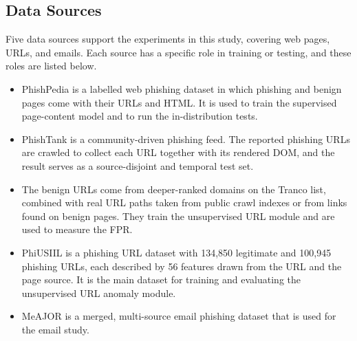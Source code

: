 \documentclass{FastFyp}
\begin{document}
\subsection{Data Sources}
Five data sources support the experiments in this study, covering web pages, URLs, and emails. Each source has a specific role in training or testing, and these roles are listed below.
\begin{itemize}
    \item PhishPedia \cite{phishpedia2021} is a labelled web phishing dataset in which phishing and benign pages come with their URLs and HTML. It is used to train the supervised page-content model and to run the in-distribution tests.
    \item PhishTank is a community-driven phishing feed. The reported phishing URLs are crawled to collect each URL together with its rendered DOM, and the result serves as a source-disjoint and temporal test set.
    \item The benign URLs come from deeper-ranked domains on the Tranco list, combined with real URL paths taken from public crawl indexes or from links found on benign pages. They train the unsupervised URL module and are used to measure the FPR.
    \item PhiUSIIL is a phishing URL dataset with 134,850 legitimate and 100,945 phishing URLs, each described by 56 features drawn from the URL and the page source. It is the main dataset for training and evaluating the unsupervised URL anomaly module.
    \item MeAJOR \cite{meajor2025} is a merged, multi-source email phishing dataset that is used for the email study.
\end{itemize}
\end{document}
